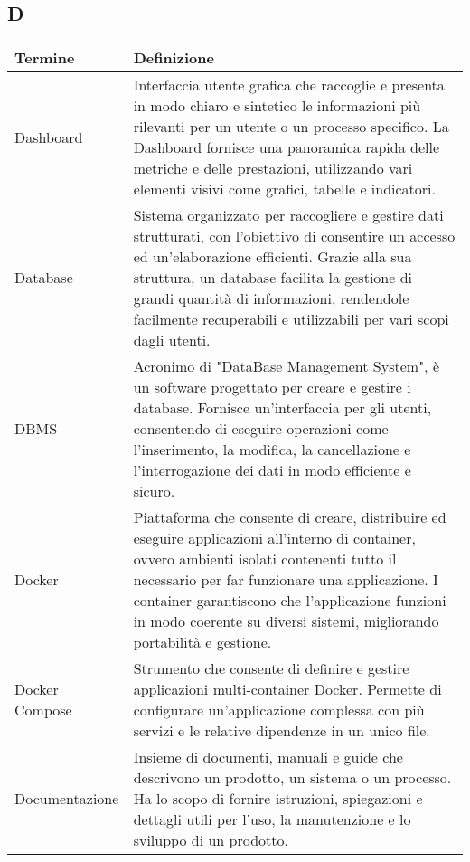 \documentclass[10pt]{article}
\begin{document}
\subsection{D} %
\begin{longtable}{|>{\centering\arraybackslash}m{2.5cm}|>{\arraybackslash}m{12.5cm}|}
\hline
\rowcolor[gray]{0.8}
\textbf{Termine} & \textbf{Definizione}\\
\endhead
\hline
Dashboard & Interfaccia utente grafica che raccoglie e presenta in modo chiaro e sintetico le informazioni più rilevanti per un utente o un processo specifico. La Dashboard fornisce una panoramica rapida delle metriche e delle prestazioni, utilizzando vari elementi visivi come grafici, tabelle e indicatori.\\
\hline
Database & Sistema organizzato per raccogliere e gestire dati strutturati, con l'obiettivo di consentire un accesso ed un'elaborazione efficienti. Grazie alla sua struttura, un database facilita la gestione di grandi quantità di informazioni, rendendole facilmente recuperabili e utilizzabili per vari scopi dagli utenti.\\
\hline
DBMS & Acronimo di "DataBase Management System", è un software progettato per creare e gestire i database. Fornisce un'interfaccia per gli utenti, consentendo di eseguire operazioni come l'inserimento, la modifica, la cancellazione e l'interrogazione dei dati in modo efficiente e sicuro.\\
\hline
Docker & Piattaforma che consente di creare, distribuire ed eseguire applicazioni all'interno di container, ovvero ambienti isolati contenenti tutto il necessario per far funzionare una applicazione. I container garantiscono che l'applicazione funzioni in modo coerente su diversi sistemi, migliorando portabilità e gestione.\\
\hline
Docker Compose & Strumento che consente di definire e gestire applicazioni multi-container Docker. Permette di configurare un'applicazione complessa con più servizi e le relative dipendenze in un unico file.\\
\hline
Documentazione & Insieme di documenti, manuali e guide che descrivono un prodotto, un sistema o un processo. Ha lo scopo di fornire istruzioni, spiegazioni e dettagli utili per l'uso, la manutenzione e lo sviluppo di un prodotto.\\
\hline
\end{longtable}
\end{document}
